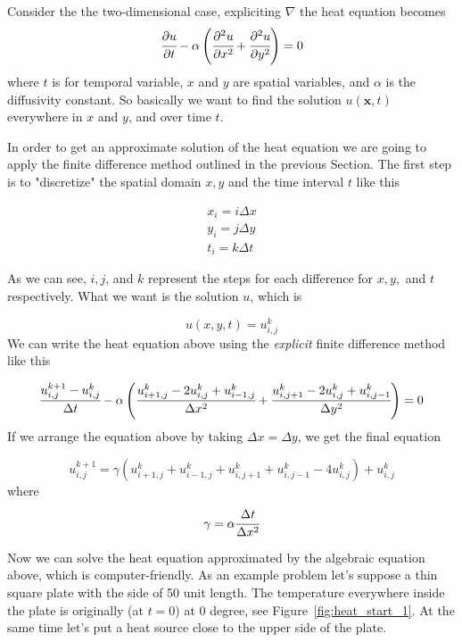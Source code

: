 Consider the the two-dimensional case, expliciting $\nabla$ the heat equation becomes
\begin{equation}
\cfrac{\partial u}{\partial t} - \alpha\left(\cfrac{\partial^2 u}{\partial x^2}+\cfrac{\partial^2 u}{\partial y^2}\right)= 0
\end{equation}
\noindent
where $t$ is for temporal variable, $x$ and $y$ are spatial variables, and $\alpha$ is the diffusivity constant. So basically we want to find the solution $u(\mathbf{x}, t)$ everywhere in $x$ and $y$, and over time $t$.

In order to get an approximate solution of the heat equation we are going to apply the finite difference method outlined in the previous Section. The first step is to "discretize" the spatial domain $x, y$ and the time interval $t$ like this

\begin{gather}
x_i = i\Delta x \\
y_i = j\Delta y \\
t_i = k\Delta t 
\end{gather}

As we can see, $i, j$, and $k$ represent the steps for each difference for $x, y,$ and $t$ respectively. What we want is the solution $u$, which is

\begin{equation}
u(x, y, t) = u_{i,j}^k
\end{equation}
We can write the heat equation above using the \emph{explicit} finite difference method like this

\begin{equation}
\cfrac{u_{i,j}^{k+1}-u_{i,j}^k}{\Delta t} - \alpha\left(\cfrac{u_{i+1,j}^{k}-2u_{i,j}^{k}+u_{i-1,j}^{k}}{\Delta x^2}+\cfrac{u_{i,j+1}^{k}-2u_{i,j}^{k}+u_{i,j-1}^{k}}{\Delta y^2}\right)=0
\end{equation}
If we arrange the equation above by taking $\Delta x = \Delta y$, we get the final equation

\begin{equation}
u_{i,j}^{k+1} = \gamma \left(u_{i+1,j}^{k}+u_{i-1,j}^{k}+u_{i,j+1}^{k}+u_{i,j-1}^{k}-4u_{i,j}^{k}\right)+u_{i,j}^{k}
\end{equation}
\noindent 
where
\begin{equation}
\gamma = \alpha\cfrac{\Delta t}{\Delta x^2}
\end{equation}

Now we can solve the heat equation approximated by the algebraic equation above, which is computer-friendly. As an example problem let’s suppose a thin square plate with the side of 50 unit length. The temperature everywhere inside the plate is originally (at $t = 0$) at 0 degree, see Figure~\ref{fig:heat_start_1}.
At the same time let's put a heat source close to the upper side of the plate.


